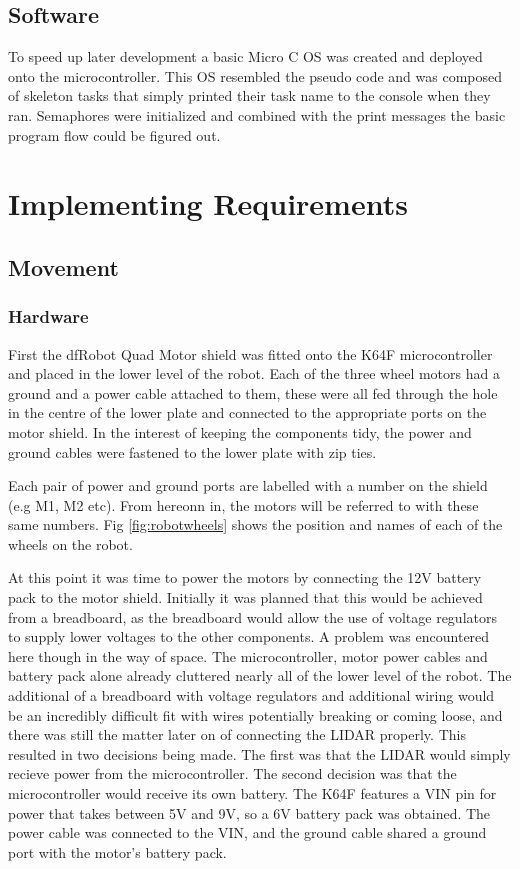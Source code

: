 			\subsection{Software}
			To speed up later development a basic Micro C OS was created and deployed onto the microcontroller. This OS resembled the pseudo code and was composed of skeleton tasks that simply printed their task name to the console when they ran. Semaphores were initialized and combined with the print messages the basic program flow could be figured out.

		\section{Implementing Requirements}
			\subsection{Movement}
				\subsubsection{Hardware}
				First the dfRobot Quad Motor shield was fitted onto the K64F microcontroller and placed in the lower level of the robot. Each of the three wheel motors had a ground and a power cable attached to them, these were all fed through the hole in the centre of the lower plate and connected to the appropriate ports on the motor shield. In the interest of keeping the components tidy, the power and ground cables were fastened to the lower plate with zip ties.
				
				Each pair of power and ground ports are labelled with a number on the shield (e.g M1, M2 etc). From hereonn in, the motors will be referred to with these same numbers. Fig \ref{fig:robotwheels} shows the position and names of each of the wheels on the robot.
			

				
				
				At this point it was time to power the motors by connecting the 12V battery pack to the motor shield. Initially it was planned that this would be achieved from a breadboard, as the breadboard would allow the use of voltage regulators to supply lower voltages to the other components. A problem was encountered here though in the way of space. The microcontroller, motor power cables and battery pack alone already cluttered nearly all of the lower level of the robot. The additional of a breadboard with voltage regulators and additional wiring would be an incredibly difficult fit with wires potentially breaking or coming loose, and there was still the matter later on of connecting the LIDAR properly. This resulted in two decisions being made. The first was that the LIDAR would simply recieve power from the microcontroller. The second decision was that the microcontroller would receive its own battery. The K64F features a VIN pin for power that takes between 5V and 9V, so a 6V battery pack was obtained. The power cable was connected to the VIN, and the ground cable shared a ground port with the motor's battery pack.
				

